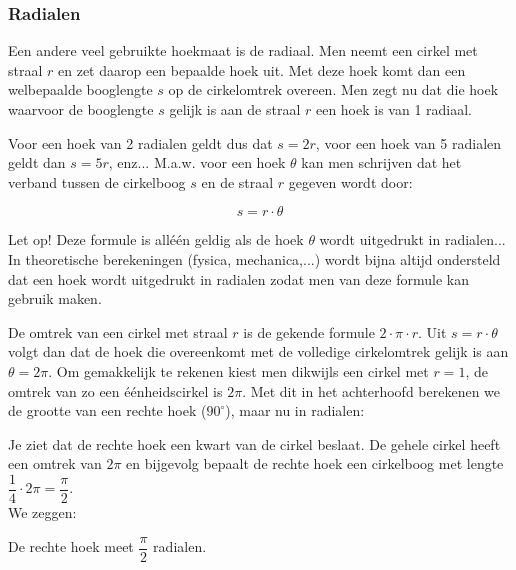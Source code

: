 \subsubsection{Radialen}

Een andere veel gebruikte hoekmaat is de radiaal. Men neemt een cirkel met straal $r$ en zet daarop een bepaalde hoek uit. Met deze hoek komt dan een welbepaalde booglengte $s$ op de cirkelomtrek overeen. Men zegt nu dat die hoek waarvoor de booglengte $s$ gelijk is aan de straal $r$ een hoek is van 1 radiaal.

\begin{figure}[H]
	\centering 
	 
\end{figure}
 

Voor een hoek van 2 radialen geldt dus dat $s=2r$, voor een hoek van 5 radialen geldt dan $s=5r$, enz... M.a.w. voor een hoek $\theta$ kan men schrijven dat het verband tussen de cirkelboog $s$ en de straal $r$ gegeven wordt door:

\[ s=r\cdot \theta \]

Let op! Deze formule is all\'{e}\'{e}n geldig als de hoek $\theta$ wordt uitgedrukt in radialen...\\

In theoretische berekeningen (fysica, mechanica,...) wordt bijna altijd ondersteld dat een hoek wordt uitgedrukt in radialen zodat men van deze formule kan gebruik maken.

De omtrek van een cirkel met straal $r$ is de gekende formule $2\cdot \pi \cdot r$. Uit $s=r\cdot \theta$ volgt dan dat de hoek die overeenkomt met de volledige cirkelomtrek gelijk is aan $\theta=2\pi$. Om gemakkelijk te rekenen kiest men dikwijls een cirkel met $r=1$, de omtrek van zo een \'{e}\'{e}nheidscirkel is $2\pi$.  Met dit in het achterhoofd berekenen we de grootte van een rechte hoek ($90^\circ$), maar nu in radialen:

\begin{figure}[H]
	\centering 
	 
\end{figure}

Je ziet dat de rechte hoek een kwart van de cirkel beslaat. De gehele cirkel heeft een omtrek van $2\pi$ en bijgevolg bepaalt de rechte hoek een cirkelboog met lengte $\dfrac{1}{4} \cdot 2\pi = \dfrac{\pi}{2}$.\\ We zeggen:

De rechte hoek meet $\dfrac{\pi}{2}$ radialen.


